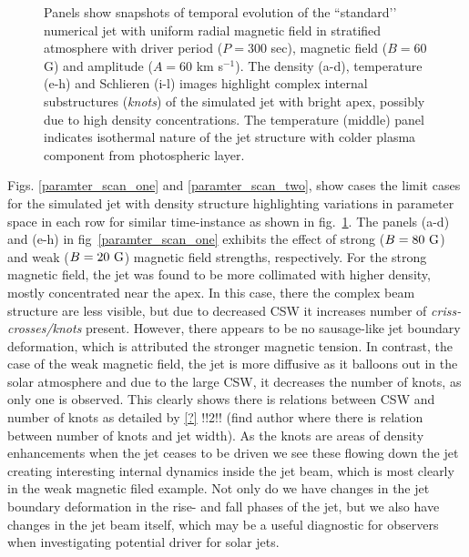 \documentclass[12pt]{ociamthesis}
\newcommand{\np}{\\ \\}
\begin{document}
\begin{figure}
\captionsetup[subfigure]{labelformat=empty}
\centering
{}
\caption{Panels show snapshots of temporal evolution of the ``standard’’ numerical jet with uniform radial magnetic field in stratified atmosphere with driver period ($P = 300$ sec), magnetic field ($B = 60$ G) and amplitude ($A = 60$ km s$^{-1}$). The density (a-d), temperature (e-h) and Schlieren (i-l) images highlight complex internal substructures (\textit{knots}) of the simulated jet with bright apex, possibly due to high density concentrations. The temperature (middle) panel indicates isothermal nature of the jet structure with colder plasma component from photospheric layer. }
\label{standard_jet}
\end{figure}
%
Figs. \ref{paramter_scan_one} and \ref{paramter_scan_two}, show cases the limit cases for the simulated jet with density structure highlighting variations in parameter space in each row for similar time-instance as shown in fig.~\ref{standard_jet}. The panels (a-d) and (e-h) in fig~\ref{paramter_scan_one} exhibits the effect of strong ($B = 80~\rm{G}$) and weak ($B = 20~\rm{G}$) magnetic field strengths, respectively. For the strong magnetic field, the jet was found to be more collimated with higher density, mostly concentrated near the apex. In this case, there the complex beam structure are less visible, but due to decreased CSW it increases number of \textit{criss-crosses/knots} present. However, there appears to be no sausage-like jet boundary deformation, which is attributed the stronger magnetic tension. In contrast, the case of the weak magnetic field, the jet is more diffusive as it balloons out in the solar atmosphere and due to the large CSW, it decreases the number of knots, as only one is observed. This clearly shows there is relations between CSW and number of knots as detailed by \ref{?} !!2!! (find author where there is relation between number of knots and jet width). As the knots are areas of density enhancements when the jet ceases to be driven we see these flowing down the jet creating interesting internal dynamics inside the jet beam, which is most clearly in the weak magnetic filed example. Not only do we have changes in the jet boundary deformation in the rise- and fall phases of the jet, but we also have changes in the jet beam itself, which may be a useful diagnostic for observers when investigating potential driver for solar jets. \np     
\end{document}
